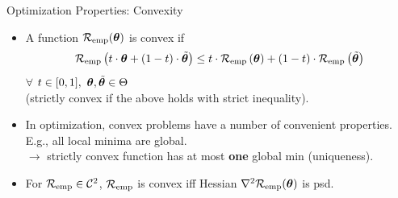 \documentclass[11pt,compress,t,notes=noshow, xcolor=table]{beamer}
\begin{document}
\begin{vbframe}{Optimization Properties: Convexity}

\begin{itemize}
  \setlength\itemsep{1.2em}
  \item A function $\mathcal{R}_{\text{emp}}(\bm{\theta})$ is convex if
  $$
  \mathcal{R}_{\text{emp}}\left(t \cdot \bm{\theta} + (1 - t) \cdot \tilde {\bm{\theta}}\right) \le t \cdot
  \mathcal{R}_{\text{emp}}\left(\bm{\theta}\right) + (1 - t) \cdot \mathcal{R}_{\text{emp}}\left(\tilde {\bm{\theta}} \right)
  $$
  $\forall$ $t \in [0, 1], ~\bm{\theta}, \tilde {\bm{\theta}} \in \Theta$\\
  (strictly convex if the above holds with strict inequality).
  \item In optimization, convex problems have a number of convenient properties. E.g., all local minima are 
  global. \vspace{0.2cm }\\
  $\rightarrow$ strictly convex function has at most 
  \textbf{one} global min (uniqueness).
  \item For $\mathcal{R}_{\text{emp}} \in \mathcal{C}^{2}$, $\mathcal{R}_{\text{emp}}$ is convex iff Hessian $\nabla^2 \mathcal{R}_{\text{emp}}(\bm{\theta})$ is psd.
\end{itemize}

\end{vbframe}

\end{document}
